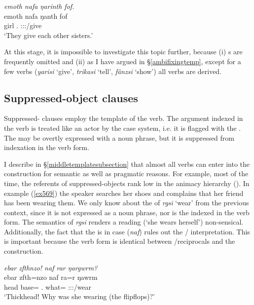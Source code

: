 \begin{exe}
 	\ex \emph{emoth nafa ŋarinth fof.}\\
 	\gll emoth nafa ŋanth fof\\
 	girl \Tnsg.\Erg{} \Stdu:\Sbj:\Nonpast:\Ipfv/give \Emph{}\\
 	\trans `They give each other sisters.'
 	\label{ex568}
\end{exe}

At this stage, it is impossible to investigate this topic further, because (i) s are frequently omitted and (ii) as I have argued in \S{}\ref{ambifixingtemp}, except for a few verbs (\emph{yarisi} `give', \emph{trikasi} `tell', \emph{fänzsi} `show') all  verbs are derived.

\subsection{Suppressed-object clauses}\label{suppressedobjectclause}

Suppressed- clauses employ the  template of the verb. The argument indexed in the verb is treated like an actor by the case system, i.e. it is flagged with the  . The  may be overtly expressed with a noun phrase, but it is suppressed from indexation in the verb form.%

I describe in \S{}\ref{middletemplatesubsection} that almost all  verbs can enter into the  construction for semantic as well as pragmatic reasons. For example, most of the time, the referents of suppressed-objects rank low in the animacy hierarchy (\citealt{Silverstein:1976vo}). In example (\ref{ex569}) the speaker searches her shoes and complains that her friend has been wearing them. We only know about the  of \emph{rgsi} `wear' from the previous context, since it is not expressed as a noun phrase, nor is the  indexed in the verb form. The semantics of \emph{rgsi} renders a  reading (`she wears herself') non-sensical. Additionally, the fact that the  is in  case (\emph{naf}) rules out the / interpretation. This is important because the verb form is identical between /reciprocals and the  construction.

\begin{exe}
	\ex \emph{ebar zfthnzo! naf rar ŋargwrm?}\\
	\gll ebar zfth=nzo naf ra=r ŋawrm\\
	head base=\Only{} \Tsg.\Erg{} what=\Purp{} \Sg:\Sbj:\Rpst:\Dur/wear\\
	\trans `Thickhead! Why was she wearing (the flipflops)?'
	\label{ex569}
\end{exe}

